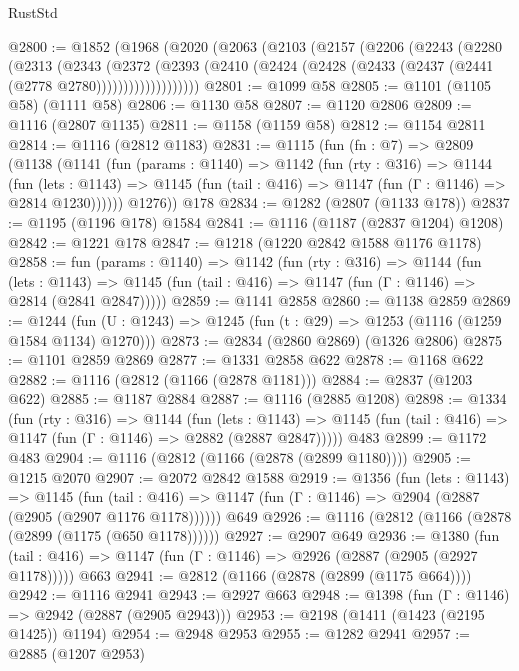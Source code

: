 \begin{lexlean}{RustStd}
\begin{coremodule}
{\begin{coremodule}
{{{{{{{{{{{@2800 := @1852
    (@1968
      (@2020
        (@2063
          (@2103
            (@2157
              (@2206
                (@2243
                  (@2280
                    (@2313
                      (@2343
                        (@2372
                          (@2393
                            (@2410
                              (@2424 (@2428 (@2433 (@2437 (@2441 (@2778 @2780)))))))))))))))))))
@2801 := @1099 @58
@2805 := @1101 (@1105 @58) (@1111 @58)
@2806 := @1130 @58
@2807 := @1120 @2806
@2809 := @1116 (@2807 @1135)
@2811 := @1158 (@1159 @58)
@2812 := @1154 @2811
@2814 := @1116 (@2812 @1183)
@2831 := @1115
    (fun (fn : @7) =>
    @2809
      (@1138
        (@1141
          (fun (params : @1140) =>
          @1142
            (fun (rty : @316) =>
            @1144
              (fun (lets : @1143) =>
              @1145 (fun (tail : @416) => @1147 (fun (Γ : @1146) => @2814 @1230))))))
        @1276))
    @178
@2834 := @1282 (@2807 (@1133 @178))
@2837 := @1195 (@1196 @178) @1584
@2841 := @1116 (@1187 (@2837 @1204) @1208)
@2842 := @1221 @178
@2847 := @1218 (@1220 @2842 @1588 @1176 @1178)
@2858 := fun (params : @1140) =>
  @1142
    (fun (rty : @316) =>
    @1144
      (fun (lets : @1143) =>
      @1145 (fun (tail : @416) => @1147 (fun (Γ : @1146) => @2814 (@2841 @2847)))))
@2859 := @1141 @2858
@2860 := @1138 @2859
@2869 := @1244 (fun (U : @1243) => @1245 (fun (t : @29) => @1253 (@1116 (@1259 @1584 @1134) @1270)))
@2873 := @2834 (@2860 @2869) (@1326 @2806)
@2875 := @1101 @2859 @2869
@2877 := @1331 @2858 @622
@2878 := @1168 @622
@2882 := @1116 (@2812 (@1166 (@2878 @1181)))
@2884 := @2837 (@1203 @622)
@2885 := @1187 @2884
@2887 := @1116 (@2885 @1208)
@2898 := @1334
    (fun (rty : @316) =>
    @1144
      (fun (lets : @1143) =>
      @1145 (fun (tail : @416) => @1147 (fun (Γ : @1146) => @2882 (@2887 @2847)))))
    @483
@2899 := @1172 @483
@2904 := @1116 (@2812 (@1166 (@2878 (@2899 @1180))))
@2905 := @1215 @2070
@2907 := @2072 @2842 @1588
@2919 := @1356
    (fun (lets : @1143) =>
    @1145
      (fun (tail : @416) => @1147 (fun (Γ : @1146) => @2904 (@2887 (@2905 (@2907 @1176 @1178))))))
    @649
@2926 := @1116 (@2812 (@1166 (@2878 (@2899 (@1175 (@650 @1178))))))
@2927 := @2907 @649
@2936 := @1380
    (fun (tail : @416) => @1147 (fun (Γ : @1146) => @2926 (@2887 (@2905 (@2927 @1178)))))
    @663
@2941 := @2812 (@1166 (@2878 (@2899 (@1175 @664))))
@2942 := @1116 @2941
@2943 := @2927 @663
@2948 := @1398 (fun (Γ : @1146) => @2942 (@2887 (@2905 @2943)))
@2953 := @2198 (@1411 (@1423 (@2195 @1425)) @1194)
@2954 := @2948 @2953
@2955 := @1282 @2941
@2957 := @2885 (@1207 @2953)
}}}}}}}}}}}
\end{coremodule}}
\end{coremodule}
\end{lexlean}
